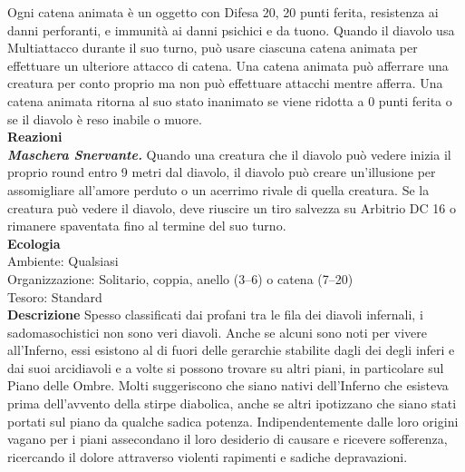 \begin{multicols}{2}
Ogni catena animata è un oggetto con Difesa 20, 20 punti ferita, resistenza ai danni perforanti, e immunità ai danni psichici e da tuono. Quando il diavolo usa Multiattacco durante il suo turno, può usare ciascuna catena animata per effettuare un ulteriore attacco di catena. Una catena animata può afferrare una creatura per conto proprio ma non può effettuare attacchi mentre afferra. Una catena animata ritorna al suo stato inanimato se viene ridotta a 0 punti ferita o se il diavolo è reso inabile o muore.\\
\textbf{Reazioni}\\
\emph{\textbf{Maschera Snervante.}} Quando una creatura che il diavolo può vedere inizia il proprio round entro 9 metri dal diavolo, il diavolo può creare un'illusione per assomigliare all'amore perduto o un acerrimo rivale di quella creatura. Se la creatura può vedere il diavolo, deve riuscire un tiro salvezza su Arbitrio DC  16 o rimanere spaventata fino al termine del suo turno.\\
\textbf{Ecologia}\\
Ambiente: Qualsiasi\\
Organizzazione: Solitario, coppia, anello (3–6) o catena (7–20)\\
Tesoro: Standard\\
\textbf{Descrizione}
Spesso classificati dai profani tra le fila dei diavoli infernali, i sadomasochistici non sono veri diavoli. Anche se alcuni sono noti per vivere all'Inferno, essi esistono al di fuori delle gerarchie stabilite dagli dei degli inferi e dai suoi arcidiavoli e a volte si possono trovare su altri piani, in particolare sul Piano delle Ombre. Molti suggeriscono che siano nativi dell'Inferno che esisteva prima dell’avvento della stirpe diabolica, anche se altri ipotizzano che siano stati portati sul piano da qualche sadica potenza. Indipendentemente dalle loro origini vagano per i piani assecondano il loro desiderio di causare e ricevere sofferenza, ricercando il dolore attraverso violenti rapimenti e sadiche depravazioni.\\


\end{multicols}
